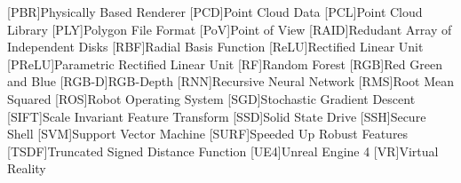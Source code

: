\begin{acronym}
    [PBR]{Physically Based Renderer}
	[PCD]{Point Cloud Data}
    [PCL]{Point Cloud Library}
    [PLY]{Polygon File Format}
	[PoV]{Point of View}
	[RAID]{Redudant Array of Independent Disks}
	[RBF]{Radial Basis Function}
	[ReLU]{Rectified Linear Unit}
    [PReLU]{Parametric Rectified Linear Unit}
    [RF]{Random Forest}
	[RGB]{Red Green and Blue}
    [RGB-D]{RGB-Depth}
	[RNN]{Recursive Neural Network}
    [RMS]{Root Mean Squared}
    [ROS]{Robot Operating System}
	[SGD]{Stochastic Gradient Descent}
	[SIFT]{Scale Invariant Feature Transform}
	[SSD]{Solid State Drive}
	[SSH]{Secure Shell}
	[SVM]{Support Vector Machine}
	[SURF]{Speeded Up Robust Features}
    [TSDF]{Truncated Signed Distance Function}
    [UE4]{Unreal Engine 4}
    [VR]{Virtual Reality}
\end{acronym}

